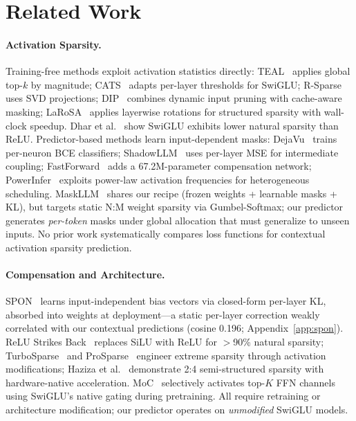 \section{Related Work}

\paragraph{Activation Sparsity.}
Training-free methods exploit activation statistics directly: TEAL~\cite{liu2025teal} applies global top-$k$ by magnitude; CATS~\cite{lee2024cats} adapts per-layer thresholds for SwiGLU; R-Sparse~\cite{zhang2025rsparse} uses SVD projections; DIP~\cite{federici2025dip} combines dynamic input pruning with cache-aware masking; LaRoSA~\cite{huang2025larosa} applies layerwise rotations for structured sparsity with wall-clock speedup.
Dhar et al.~\cite{dhar2024activation} show SwiGLU exhibits lower natural sparsity than ReLU.
Predictor-based methods learn input-dependent masks: DejaVu~\cite{liu2023dejavu} trains per-neuron BCE classifiers; ShadowLLM~\cite{akhauri2024shadowllm} uses per-layer MSE for intermediate coupling; FastForward~\cite{gautam2026fastforward} adds a 67.2M-parameter compensation network; PowerInfer~\cite{song2024powerinfer} exploits power-law activation frequencies for heterogeneous scheduling.
MaskLLM~\cite{fang2024maskllm} shares our recipe (frozen weights + learnable masks + KL), but targets static N:M weight sparsity via Gumbel-Softmax; our predictor generates \emph{per-token} masks under global allocation that must generalize to unseen inputs.
No prior work systematically compares loss functions for contextual activation sparsity prediction.

\paragraph{Compensation and Architecture.}
SPON~\cite{xu2025spon} learns input-independent bias vectors via closed-form per-layer KL, absorbed into weights at deployment---a static per-layer correction weakly correlated with our contextual predictions (cosine 0.196; Appendix~\ref{app:spon}).
ReLU Strikes Back~\cite{mirzadeh2024relu} replaces SiLU with ReLU for $>$90\% natural sparsity; TurboSparse~\cite{song2024turbosparse} and ProSparse~\cite{song2025prosparse} engineer extreme sparsity through activation modifications; Haziza et al.~\cite{haziza2025accelerating} demonstrate 2:4 semi-structured sparsity with hardware-native acceleration.
MoC~\cite{wu2025moc} selectively activates top-$K$ FFN channels using SwiGLU's native gating during pretraining.
All require retraining or architecture modification; our predictor operates on \emph{unmodified} SwiGLU models.

